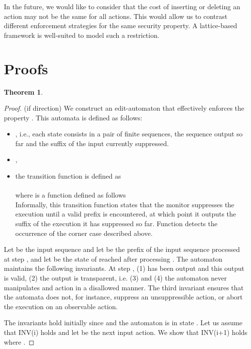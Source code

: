 \documentclass[12pt]{article}
\newtheorem{thm}{Theorem}
\begin{document}
In the future, we would like to consider that the cost of inserting or deleting an action may not be the same for all actions.  This would allow us to contrast different enforcement strategies for the same security property. A lattice-based framework is well-suited to model such a restriction.




\newpage
\appendix
\section{Proofs} \label{App:AppendixA}
\setcounter{thm}{0}
\setcounter{cor}{0}
\begin{thm}

\end{thm}
\begin{proof}
(if direction) We construct an edit-automaton  that effectively enforces the property \Property. This automata is defined as follows:
\begin{itemize}
  \item , i.e., each state consists in a pair of finite sequences, the sequence output so far and the suffix of the input currently suppressed.
  \item ,
  \item the transition function  is defined as \\
  
    \\where  is a function defined as follows \\
    
    Informally, this transition function states that the monitor suppresses the execution until a valid prefix is encountered, at which point it outputs the suffix of the execution it has suppressed so far. Function  detects the occurrence of the corner case described above.


\end{itemize}
Let  be the input sequence and let  be the prefix of the input sequence processed at step , and let  be the state of   reached after processing .  The automaton maintains the following invariants.
At step , (1)  has been output and this output is valid, (2) the output is transparent, i.e.  (3) and (4) the automaton  never manipulates and action in a disallowed manner.
The third invariant ensures that the automata does not, for instance, suppress an unsuppressible action, or abort the execution on an observable action.

The invariants hold initially since  and the automaton is in state .  Let us assume that INV(i) holds and let  be the next input action. We show that INV(i+1) holds where .


\end{proof}
\end{document}
